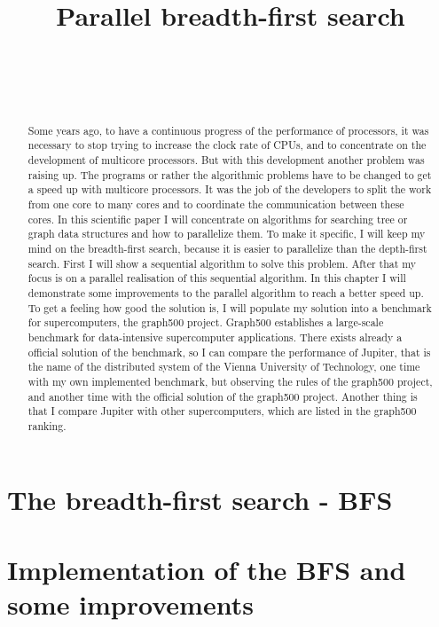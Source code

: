 \documentclass[11pt,a4paper]{article}
\title{Parallel breadth-first search}
\author{
 \authorname{Alexander Gallauner} \\
 \studentnumber{1026090} \\
 \curriculum{534} \\
 \email{e1026090@student.tuwien.ac.at}
}
\begin{document}
\maketitle
\begin{abstract}
Some years ago, to have a continuous progress of the performance of processors, it was necessary to stop trying to increase the clock rate of CPUs, and to concentrate on the development of multicore processors. But with this development another problem was raising up. The programs or rather the algorithmic problems have to be changed to get a speed up with multicore processors. It was the job of the developers to split the work from one core to many cores and to coordinate the communication between these cores. In this scientific paper I will concentrate on algorithms for searching tree or graph data structures and how to parallelize them. To make it specific, I will keep my mind on the breadth-first search, because it is easier to parallelize than the depth-first search. First I will show a sequential algorithm to solve this problem. After that my focus is on a parallel realisation of this sequential algorithm. In this chapter I will demonstrate some improvements to the parallel algorithm to reach a better speed up.
To get a feeling how good the solution is, I will populate my solution into a benchmark for supercomputers, the graph500 project. Graph500 establishes a large-scale benchmark for data-intensive supercomputer applications. There exists already a official solution of the benchmark, so I can compare the performance of Jupiter, that is the name of the distributed system of the Vienna University of Technology, one time with my own implemented benchmark, but observing the rules of the graph500 project, and another time with the official solution of the graph500 project. Another thing is that I compare Jupiter with other supercomputers, which are listed in the graph500 ranking.
\end{abstract}

\clearpage

\section{The breadth-first search - BFS}
\label{sec:breadth-first search}

\section{Implementation of the BFS and some improvements}
\label{sec:implementations}
\end{document}

